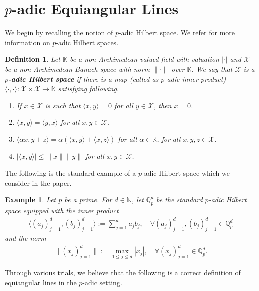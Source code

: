 \documentclass{amsart}
\newtheorem{definition}[theorem]{Definition}
\newtheorem{example}[theorem]{Example}
\begin{document}
\section{$p$-adic Equiangular Lines}
We begin by recalling the   notion of  $p$-adic Hilbert space.  We refer  \cite{KALISCH, DIAGANABOOK, DIAGANARAMAROSON, KHRENNIKOV, ALBEVERIO} for more  information on $p$-adic Hilbert spaces.
\begin{definition}\cite{DIAGANABOOK, DIAGANARAMAROSON} \label{PADICDEF}
	Let $\mathbb{K}$ be a non-Archimedean  valued field with valuation $|\cdot|$ and $\mathcal{X}$ be a non-Archimedean Banach space with norm $\|\cdot\|$ over $\mathbb{K}$. We say that $\mathcal{X}$ is a \textbf{$p$-adic Hilbert space} if there is a map (called as $p$-adic inner product) $\langle \cdot, \cdot \rangle: \mathcal{X} \times \mathcal{X} \to \mathbb{K}$ satisfying following.
	\begin{enumerate}[\upshape (i)]
		\item If $x \in \mathcal{X}$ is such that $\langle x,y \rangle =0$ for all $y \in \mathcal{X}$, then $x=0$.
		\item $\langle x, y \rangle =\langle y, x \rangle$ for all $x,y \in \mathcal{X}$.
		\item $\langle \alpha x, y+z \rangle =\alpha (\langle x,  y \rangle+\langle x,z\rangle)$ for all  $\alpha  \in \mathbb{K}$, for all $x,y,z \in \mathcal{X}$.
		\item $|\langle x, y \rangle |\leq \|x\|\|y\|$ for all $x,y \in \mathcal{X}$.
	\end{enumerate}
\end{definition}
The following is the  standard example of a $p$-adic Hilbert space which we consider in the paper.
\begin{example}\cite{KALISCH}
	Let $p$ be a prime. For $d \in \mathbb{N}$, let $\mathbb{Q}_p^d$ be the standard $p$-adic Hilbert space equipped with the inner product 
	\begin{align*}
		\langle (a_j)_{j=1}^d,(b_j)_{j=1}^d\rangle := \sum_{j=1}^da_jb_j,  \quad \forall (a_j)_{j=1}^d,(b_j)_{j=1}^d \in \mathbb{Q}_p^d
	\end{align*}
	and the norm 
	\begin{align*}
		\|(x_j)_{j=1}^d\|:= \max_{1\leq j \leq d}|x_j|, \quad \forall (x_j)_{j=1}^d\in 	\mathbb{Q}_p^d.
	\end{align*}
\end{example}
Through various trials, we believe that the following is a correct definition of equiangular lines in the $p$-adic setting.
\end{document}
